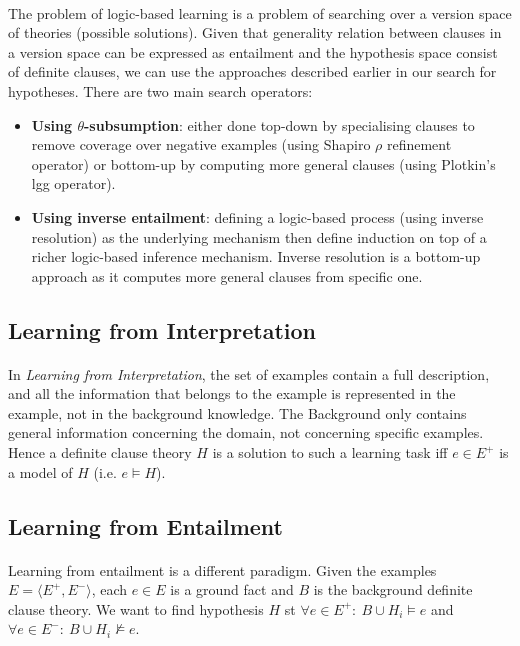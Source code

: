 \documentclass{article}
\theoremstyle{plain}
\theoremstyle{definition}
\begin{document}
\begin{multicols}{2}
\paragraph{} The problem of logic-based learning is a problem of searching over a version space of theories (possible solutions). Given that generality relation between clauses in a version space can be expressed as entailment and the hypothesis space consist of definite clauses, we can use the approaches described earlier in our search for hypotheses. There are two main search operators:

\begin{itemize}
\item \textbf{Using $\theta$-subsumption}: either done top-down by specialising clauses to remove coverage over negative examples (using Shapiro $\rho$ refinement operator) or bottom-up by computing more general clauses (using Plotkin's lgg operator).
\item \textbf{Using inverse entailment}: defining a logic-based process (using inverse resolution) as the underlying mechanism then define induction on top of a richer logic-based inference mechanism. Inverse resolution is a bottom-up approach as it computes more general clauses from specific one.
\end{itemize}

\subsection{Learning from Interpretation}

\paragraph{} In \textit{Learning from Interpretation}, the set of examples contain a full description, and all the information that belongs to the example is represented in the example, not in the background knowledge. The Background only contains general information concerning the domain, not concerning specific examples. Hence a definite clause theory $H$ is a solution to such a learning task iff $e \in E^+$ is a model of $H$ (i.e. $e \models H$).

\subsection{Learning from Entailment}

\paragraph{} Learning from entailment is a different paradigm. Given the examples $E = \langle E^+, E^- \rangle$, each $e \in E$ is a ground fact and $B$ is the background definite clause theory. We want to find hypothesis $H$ st $\forall e \in E^+:\ B \cup H_i \models e$ and $\forall e \in E^-:\ B \cup H_i \not\models e$.


\end{multicols}
\end{document}
